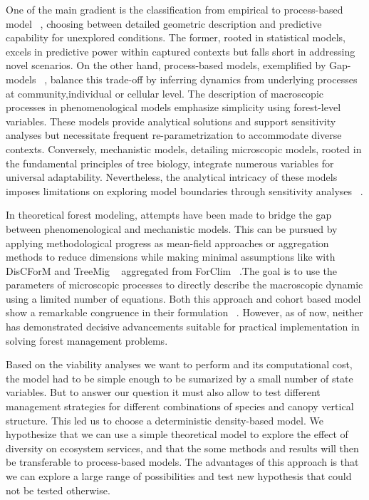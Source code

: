 \documentclass{article}
\begin{document}
One of the main gradient is the classification from empirical to process-based model ~\autocite{fontesModelsSupportingForest2011},  choosing between detailed geometric description and predictive capability for unexplored conditions. The former, rooted in statistical models, excels in predictive power within captured contexts but falls short in addressing novel scenarios. On the other hand, process-based models, exemplified by Gap-models ~\autocite{bugmannREVIEWFORESTGAP2001}, balance this trade-off by inferring dynamics from underlying processes at community,individual or cellular level. The description of macroscopic processes in phenomenological models emphasize simplicity using forest-level variables. These models provide analytical solutions and support sensitivity analyses but necessitate frequent re-parametrization to accommodate diverse contexts. Conversely, mechanistic models, detailing microscopic models, rooted in the fundamental principles of tree biology, integrate numerous variables for universal adaptability. Nevertheless, the analytical intricacy of these models imposes limitations on exploring model boundaries through sensitivity analyses ~\autocite{bugmannREVIEWFORESTGAP2001}.

In theoretical forest modeling, attempts have been made to bridge the gap between phenomenological and mechanistic models. This can be pursued by applying methodological progress as mean-field approaches or aggregation methods to reduce dimensions while making minimal assumptions like  with DisCForM and TreeMig ~\autocite{lischkeAggregationIndividualTrees1998,lischkeTreeMigForestlandscapeModel2006} aggregated from ForClim ~\autocite{bugmannEcologyMountainousForests1994}.The goal is to use the parameters of microscopic processes to directly describe the macroscopic dynamic using a limited number of equations.
Both this approach and cohort based model show a remarkable congruence in their formulation ~\autocite{bugmannREVIEWFORESTGAP2001}. However, as of now, neither has demonstrated decisive advancements suitable for practical implementation in solving forest management problems.

Based on the viability analyses we want to perform and its computational cost, the model had to be simple enough to be sumarized by a small number of state variables. But to answer our question it must also allow to test different management strategies for different combinations of species and canopy vertical structure. This led us to choose a deterministic density-based model. We hypothesize that we can use a simple theoretical model to explore the effect of diversity on ecosystem services, and that the some methods and results will then be transferable to process-based models. The advantages of this approach is that we can explore a large range of possibilities and test new hypothesis that could not be tested otherwise.
\end{document}
